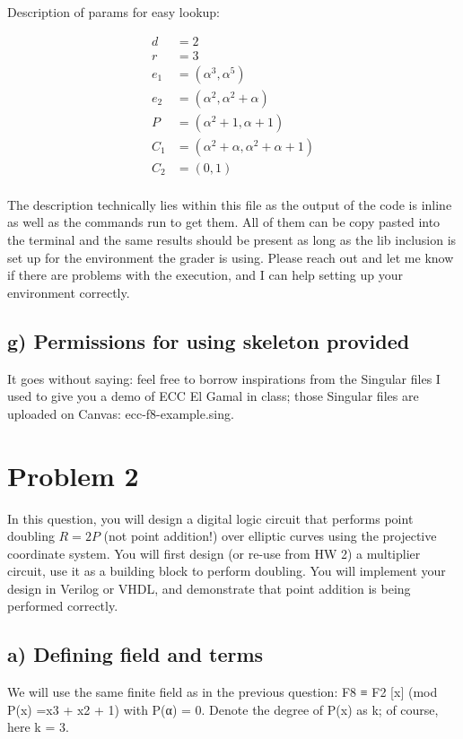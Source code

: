 \documentclass[a4paper,11pt]{exam}
\begin{document}
\newline
\noindent
Description of params for easy lookup:

\begin{align*}
  d &= 2\\
  r &= 3\\
e_1 &= (\alpha^3,\alpha^5)\\
e_2 &= (\alpha^2,\alpha^2 + \alpha)\\
  P &= (\alpha^2 + 1,\alpha + 1)\\
C_1 &= (\alpha^2 + \alpha,\alpha^2 + \alpha + 1)\\
C_2 &= (0,1)\\
\end{align*}

\noindent
The description technically lies within this file as the output of the code is inline as well as the commands run to get them. All of them can be copy pasted into the terminal and the same results should be present as long as the lib inclusion is set up for the environment the grader is using. Please reach out and let me know if there are problems with the execution, and I can help setting up your environment correctly. 

\subsection{g) Permissions for using skeleton provided}
\label{sec:org2f17cf4}
It goes without saying: feel free to borrow inspirations from the Singular files I used to give you a demo of ECC El Gamal in class; those Singular files are uploaded on Canvas: ecc-f8-example.sing.



\section{Problem 2}
\label{sec:org85bba61}
In this question, you will design a digital logic circuit that performs point doubling \(R = 2P\)  (not point addition!) over elliptic curves using the projective coordinate system. You will first design (or re-use from HW 2) a multiplier circuit, use it as a building block to perform doubling. You will implement your design in Verilog or VHDL, and demonstrate that point addition is being performed correctly.

\subsection{a) Defining field and terms}
\label{sec:org3ae0203}
We will use the same finite field as in the previous question: F8 ≡ F2 [x] (mod P(x) =x3 + x2 + 1) with P(α) = 0. Denote the degree of P(x) as k; of course, here k = 3.
\end{document}

